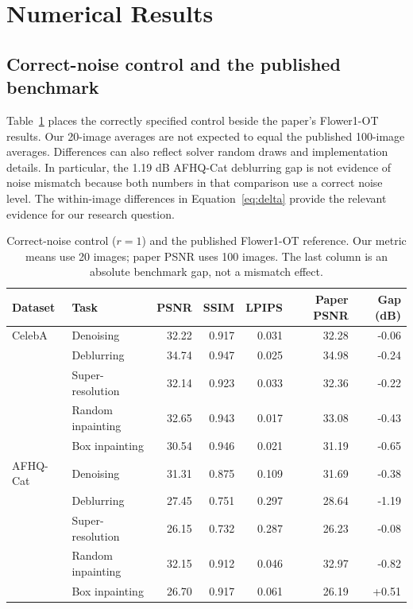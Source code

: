 \documentclass[10pt,letterpaper]{article}
\begin{document}
\section{Numerical Results}
\subsection{Correct-noise control and the published benchmark}
Table~\ref{tab:control} places the correctly specified control beside the paper's Flower1-OT results. Our 20-image averages are not expected to equal the published 100-image averages. Differences can also reflect solver random draws and implementation details. In particular, the 1.19 dB AFHQ-Cat deblurring gap is not evidence of noise mismatch because both numbers in that comparison use a correct noise level. The within-image differences in Equation~\eqref{eq:delta} provide the relevant evidence for our research question.

\begin{table}[H]\centering\small
\caption{Correct-noise control ($r=1$) and the published Flower1-OT reference. Our metric means use 20 images; paper PSNR uses 100 images. The last column is an absolute benchmark gap, not a mismatch effect.}
\label{tab:control}
\begin{tabular}{llrrrrr}
\toprule
Dataset & Task & PSNR & SSIM & LPIPS & Paper PSNR & Gap (dB)\\
\midrule
CelebA & Denoising & 32.22 & 0.917 & 0.031 & 32.28 & -0.06 \\
 & Deblurring & 34.74 & 0.947 & 0.025 & 34.98 & -0.24 \\
 & Super-resolution & 32.14 & 0.923 & 0.033 & 32.36 & -0.22 \\
 & Random inpainting & 32.65 & 0.943 & 0.017 & 33.08 & -0.43 \\
 & Box inpainting & 30.54 & 0.946 & 0.021 & 31.19 & -0.65 \\
\midrule
AFHQ-Cat & Denoising & 31.31 & 0.875 & 0.109 & 31.69 & -0.38 \\
 & Deblurring & 27.45 & 0.751 & 0.297 & 28.64 & -1.19 \\
 & Super-resolution & 26.15 & 0.732 & 0.287 & 26.23 & -0.08 \\
 & Random inpainting & 32.15 & 0.912 & 0.046 & 32.97 & -0.82 \\
 & Box inpainting & 26.70 & 0.917 & 0.061 & 26.19 & +0.51 \\
\bottomrule
\end{tabular}
\end{table}
\end{document}
